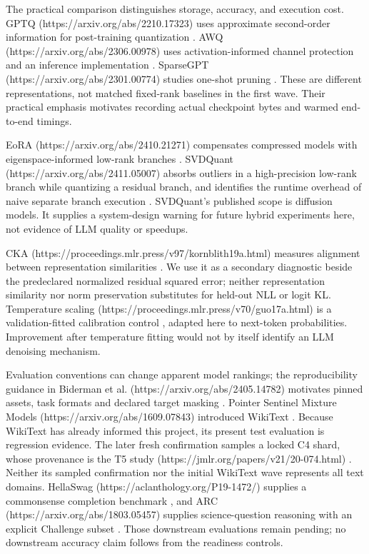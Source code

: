 \documentclass[10pt]{article}
\begin{document}
The practical comparison distinguishes storage, accuracy, and execution cost.
GPTQ (https://arxiv.org/abs/2210.17323) uses approximate second-order information
for post-training quantization \cite{frantar2022gptq}.
AWQ (https://arxiv.org/abs/2306.00978) uses activation-informed channel protection
and an inference implementation \cite{lin2023awq}.
SparseGPT (https://arxiv.org/abs/2301.00774) studies one-shot pruning
\cite{frantar2023sparsegpt}. These are different representations, not matched
fixed-rank baselines in the first wave. Their practical emphasis motivates
recording actual checkpoint bytes and warmed end-to-end timings.

EoRA (https://arxiv.org/abs/2410.21271) compensates compressed models with
eigenspace-informed low-rank branches \cite{liu2024eora}.
SVDQuant (https://arxiv.org/abs/2411.05007) absorbs outliers in a high-precision
low-rank branch while quantizing a residual branch, and identifies the runtime
overhead of naive separate branch execution \cite{li2024svdquant}. SVDQuant's
published scope is diffusion models. It supplies a system-design warning for
future hybrid experiments here, not evidence of LLM quality or speedups.

CKA (https://proceedings.mlr.press/v97/kornblith19a.html) measures alignment
between representation similarities \cite{kornblith2019cka}. We use it as a
secondary diagnostic beside the predeclared normalized residual squared error;
neither representation similarity nor norm preservation substitutes for held-out
NLL or logit KL. Temperature scaling (https://proceedings.mlr.press/v70/guo17a.html)
is a validation-fitted calibration control \cite{guo2017calibration}, adapted here
to next-token probabilities. Improvement after temperature fitting would not
by itself identify an LLM denoising mechanism.

Evaluation conventions can change apparent model rankings; the reproducibility
guidance in Biderman et al. (https://arxiv.org/abs/2405.14782) motivates pinned
assets, task formats and declared target masking \cite{biderman2024evaluation}.
Pointer Sentinel Mixture Models (https://arxiv.org/abs/1609.07843) introduced
WikiText \cite{merity2016wikitext}. Because WikiText has already informed this
project, its present test evaluation is regression evidence. The later fresh
confirmation samples a locked C4 shard, whose provenance is the
T5 study (https://jmlr.org/papers/v21/20-074.html) \cite{raffel2020t5}. Neither its
sampled confirmation nor the initial WikiText wave represents all text domains.
HellaSwag (https://aclanthology.org/P19-1472/) supplies a commonsense completion
benchmark \cite{zellers2019hellaswag}, and ARC (https://arxiv.org/abs/1803.05457)
supplies science-question reasoning with an explicit Challenge subset
\cite{clark2018arc}. Those downstream evaluations remain pending; no downstream
accuracy claim follows from the readiness controls.
\end{document}
